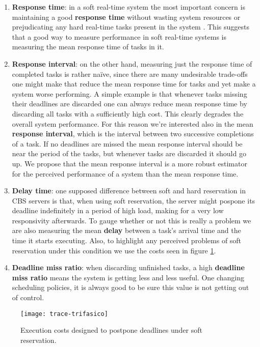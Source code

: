\documentclass[times, 10pt,twocolumn]{article}
\begin{document}
\begin{enumerate}
\item \textbf{Response time}: in a soft real-time system the most
  important concern is maintaining a good \textbf{response time}
  without wasting system resources or prejudicating any hard real-time
  tasks present in the system \cite{buttazzo05:soft}. This suggests
  that a good way to measure performance in soft real-time systems is
  measuring the mean response time of tasks in it.
\item \textbf{Response interval}: on the other hand, measuring just
  the response time of completed tasks is rather naïve, since there
  are many undesirable trade-offs one might make that reduce the mean
  response time for tasks and yet make a system worse performing. A
  simple example is that whenever tasks missing their deadlines are
  discarded one can always reduce mean response time by discarding all
  tasks with a sufficiently high cost. This clearly degrades the
  overall system performance. For this reason we're interested also in
  the mean \textbf{response interval}, which is the interval between
  two successive completions of a task. If no deadlines are missed the
  mean response interval should be near the period of the tasks, but
  whenever tasks are discarded it should go up. We propose that the
  mean response interval is a more robust estimator for the perceived
  performance of a system than the mean response time.
\item \textbf{Delay time}: one supposed difference between soft and
  hard reservation in CBS servers is that, when using soft
  reservation, the server might pospone its deadline indefinitely in a
  period of high load, making for a very low responsivity
  afterwards. To gauge whether or not this is really a problem we are
  also measuring the mean \textbf{delay} between a task's arrival time
  and the time it starts executing. Also, to highlight any perceived
  problems of soft reservation under this condition we use the costs
  seen in figure \ref{fig:costs-trifasico}.
\item \textbf{Deadline miss ratio}: when discarding unfinished tasks,
  a high \textbf{deadline miss ratio} means the system is getting less
  and less useful. One changing scheduling policies, it is always good
  to be sure this value is not getting out of control.
\end{enumerate}


\begin{figure}[t]
  \centering
  \texttt{[image: trace-trifasico]}
  \caption{Execution costs designed to postpone deadlines under soft reservation.}
  \label{fig:costs-trifasico}
\end{figure}
\end{document}
